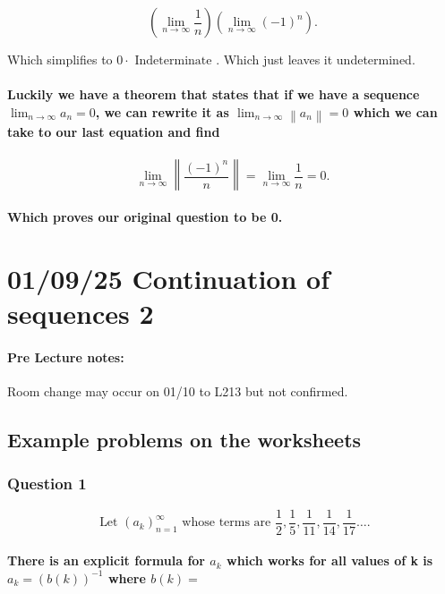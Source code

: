 \[
	\left( \lim_{n \to \infty} \frac{1}{n} \right) \left( \lim_{n \to \infty} \left( -1 \right) ^{n} \right) 
.\] 

Which simplifies to $0 \cdot \text{ Indeterminate }$. Which just leaves it undetermined. 

\paragraph{Luckily we have a theorem that states that if we have a sequence $\lim_{n \to \infty} a_n = 0$, we can rewrite it as $\lim_{n \to \infty} \left\|a_n\right\| = 0$ which we can take to our last equation and find}

\[
\lim_{n \to \infty} \left\|\frac{\left( -1 \right) ^{n}}{n}\right\|=\lim_{n \to \infty} \frac{1}{n}=0
.\] 
\paragraph{Which proves our original question to be 0.}

\section*{01/09/25 Continuation of sequences 2}%
\label{sec:01/09/25 Continuation of sequences 2}

\paragraph{Pre Lecture notes:}
Room change may occur on 01/10 to L213 but not confirmed.

\subsection{Example problems on the worksheets}%
\label{sub:Example problems on the worksheets}

\subsubsection{Question 1}
\[
\text{ Let }\left( a_k \right) _{ n=1 }^{ \infty } \text{ whose terms are  } \frac{1}{2}, \frac{1}{5}, \frac{1}{11}, \frac{1}{14}, \frac{1}{17}\ldots
.\] 
\paragraph{There is an explicit formula for $ a_k $ which works for all values of k is $ a_k = \left( b\left( k \right)  \right) ^{ -1 } $ where $ b\left( k \right)= $ }

